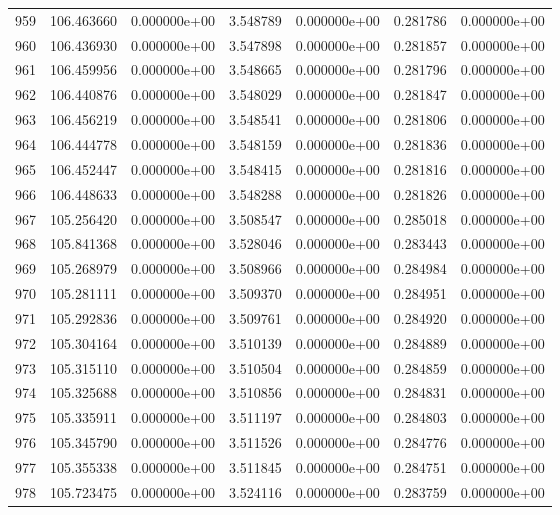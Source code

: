 \begin{tabular}{rrrrrrr}
 959 & 106.463660 &  0.000000e+00 &  3.548789 &  0.000000e+00 &   0.281786 &  0.000000e+00 \\
 960 & 106.436930 &  0.000000e+00 &  3.547898 &  0.000000e+00 &   0.281857 &  0.000000e+00 \\
 961 & 106.459956 &  0.000000e+00 &  3.548665 &  0.000000e+00 &   0.281796 &  0.000000e+00 \\
 962 & 106.440876 &  0.000000e+00 &  3.548029 &  0.000000e+00 &   0.281847 &  0.000000e+00 \\
 963 & 106.456219 &  0.000000e+00 &  3.548541 &  0.000000e+00 &   0.281806 &  0.000000e+00 \\
 964 & 106.444778 &  0.000000e+00 &  3.548159 &  0.000000e+00 &   0.281836 &  0.000000e+00 \\
 965 & 106.452447 &  0.000000e+00 &  3.548415 &  0.000000e+00 &   0.281816 &  0.000000e+00 \\
 966 & 106.448633 &  0.000000e+00 &  3.548288 &  0.000000e+00 &   0.281826 &  0.000000e+00 \\
 967 & 105.256420 &  0.000000e+00 &  3.508547 &  0.000000e+00 &   0.285018 &  0.000000e+00 \\
 968 & 105.841368 &  0.000000e+00 &  3.528046 &  0.000000e+00 &   0.283443 &  0.000000e+00 \\
 969 & 105.268979 &  0.000000e+00 &  3.508966 &  0.000000e+00 &   0.284984 &  0.000000e+00 \\
 970 & 105.281111 &  0.000000e+00 &  3.509370 &  0.000000e+00 &   0.284951 &  0.000000e+00 \\
 971 & 105.292836 &  0.000000e+00 &  3.509761 &  0.000000e+00 &   0.284920 &  0.000000e+00 \\
 972 & 105.304164 &  0.000000e+00 &  3.510139 &  0.000000e+00 &   0.284889 &  0.000000e+00 \\
 973 & 105.315110 &  0.000000e+00 &  3.510504 &  0.000000e+00 &   0.284859 &  0.000000e+00 \\
 974 & 105.325688 &  0.000000e+00 &  3.510856 &  0.000000e+00 &   0.284831 &  0.000000e+00 \\
 975 & 105.335911 &  0.000000e+00 &  3.511197 &  0.000000e+00 &   0.284803 &  0.000000e+00 \\
 976 & 105.345790 &  0.000000e+00 &  3.511526 &  0.000000e+00 &   0.284776 &  0.000000e+00 \\
 977 & 105.355338 &  0.000000e+00 &  3.511845 &  0.000000e+00 &   0.284751 &  0.000000e+00 \\
 978 & 105.723475 &  0.000000e+00 &  3.524116 &  0.000000e+00 &   0.283759 &  0.000000e+00 \\

\end{tabular}
